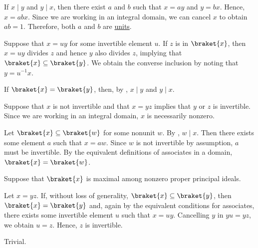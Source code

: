 \begin{defproof}
   If \( x \mid y \) and \( y \mid x \), then there exist \( a \) and \( b \) such that \( x = ay \) and \( y = bx \). Hence, \( x = abx \). Since we are working in an integral domain, we can cancel \( x \) to obtain \( ab = 1 \). Therefore, both \( a \) and \( b \) are \hyperref[def:divisibility/invertible]{units}.

   Suppose that \( x = uy \) for some invertible element \( u \). If \( z \) is in \( \braket{ x } \), then \( x = uy \) divides \( z \) and hence \( y \) also divides \( z \), implying that \( \braket{ x } \subseteq \braket{ y } \). We obtain the converse inclusion by noting that \( y = u^{-1} x \).

   If \( \braket{ x } = \braket{ y } \), then, by , \( x \mid y \) and \( y \mid x \).

   Suppose that \( x \) is not invertible and that \( x = yz \) implies that \( y \) or \( z \) is invertible. Since we are working in an integral domain, \( x \) is necessarily nonzero.

  Let \( \braket{ x } \subseteq \braket{ w } \) for some nonunit \( w \). By , \( w \mid x \). Then there exists some element \( a \) such that \( x = aw \). Since \( w \) is not invertible by assumption, \( a \) must be invertible. By the equivalent definitions of associates in a domain, \( \braket{ x } = \braket{ w } \).

   Suppose that \( \braket{ x } \) is maximal among nonzero proper principal ideals.

  Let \( x = yz \). If, without loss of generality, \( \braket{ x } \subseteq \braket{ y } \), then \( \braket{ x } = \braket{ y } \) and, again by the equivalent conditions for associates, there exists some invertible element \( u \) such that \( x = uy \). Cancelling \( y \) in \( yu = yz \), we obtain \( u = z \). Hence, \( z \) is invertible.

   Trivial.
\end{defproof}

